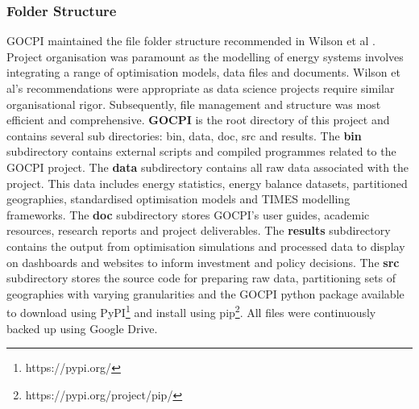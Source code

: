 \documentclass[12pt]{article}
\begin{document}
\subsubsection{Folder Structure}
GOCPI maintained the file folder structure recommended in Wilson et al \cite{J:10}. Project organisation was paramount as the modelling of energy systems involves
integrating a range of optimisation models, data files and documents. Wilson et al's recommendations were appropriate as data science projects require similar 
organisational rigor. Subsequently, file management and structure was most efficient and comprehensive. \textbf{GOCPI} is the root directory of this project and contains several
sub directories: bin, data, doc, src and results.  The \textbf{bin} subdirectory contains external scripts and compiled
programmes related to the GOCPI project. The \textbf{data} subdirectory contains all raw data associated with the project. 
This data includes energy statistics, energy balance datasets, partitioned geographies, standardised optimisation models and TIMES modelling frameworks.
The \textbf{doc} subdirectory stores GOCPI's user guides, academic resources, research reports and project deliverables.
The \textbf{results} subdirectory contains the output from optimisation simulations and processed data to display on dashboards and websites to inform investment and policy decisions.
The \textbf{src} subdirectory stores the source code for preparing raw data, partitioning sets of geographies with varying granularities and the
GOCPI python package available to download using PyPI\footnote[2]{https://pypi.org/} and install using pip\footnote[3]{https://pypi.org/project/pip/}.
All files were continuously backed up using Google Drive.
\end{document}
